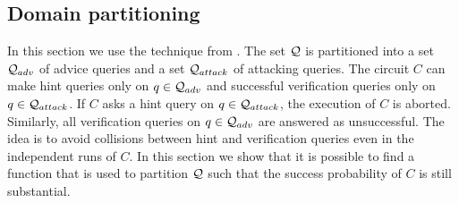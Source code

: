 %
\subsection{Domain partitioning}
\label{st:domain_partition}
In this section we use the technique from \cite{dodis2009security}.
The set $\mathcal{Q}$ is partitioned into a set $\mathcal{Q}_{adv}$ of advice queries and a set $\mathcal{Q}_{attack}$ of attacking queries.
The circuit $C$ can make hint queries only on $q \in \mathcal{Q}_{adv}$ and successful verification queries only on $q \in \mathcal{Q}_{attack}$.
If $C$ asks a hint query on $q \in \mathcal{Q}_{attack}$, the execution of $C$ is aborted.
Similarly, all verification queries on $q \in \mathcal{Q}_{adv}$ are answered as unsuccessful.
The idea is to avoid collisions between hint and verification queries even in the independent runs of $C$.
In this section we show that it is possible to find a function that is used to partition $\mathcal{Q}$
such that the success probability of $C$ is still substantial.

